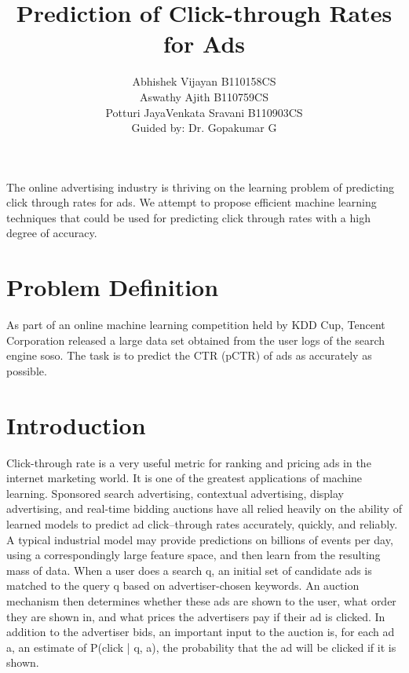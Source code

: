 \documentclass[10pt]{article}
\title{Prediction of Click-through Rates for Ads}
\author{ Abhishek Vijayan     B110158CS\\  Aswathy Ajith     B110759CS\\  Potturi JayaVenkata Sravani    B110903CS\\  Guided by: Dr. Gopakumar G}
\begin{document}
	
\maketitle
	

\abstract{} 
The online advertising industry is thriving on the learning problem of predicting click through rates for ads. We attempt to propose efficient machine learning techniques that could be used for predicting click through rates with a high degree of accuracy.
\section{Problem Definition}
As part of an online machine learning competition held by KDD Cup, Tencent Corporation released a large data set obtained from the user logs of the search engine soso. The task is to predict the CTR (pCTR) of ads as accurately as possible.
\section{Introduction}
Click-through rate is a very useful metric for ranking and pricing ads in the internet marketing world. It is one of the greatest applications of machine learning. Sponsored search advertising, contextual advertising, display advertising, and real-time bidding auctions have all relied heavily on the ability of learned models to predict ad click–through rates accurately, quickly, and reliably.  A typical industrial model may provide predictions on billions of events per day, using a correspondingly large feature space, and then learn from the resulting mass of data. When a user does a search q, an initial set of candidate ads is matched to the query q based on advertiser-chosen keywords. An auction mechanism then determines whether these ads are shown to the user, what order they are shown in, and what prices the advertisers pay if their ad is clicked. In addition to the advertiser bids, an important input to the auction is, for each ad a, an estimate of P(click | q, a), the probability that the ad will be clicked if it is shown.
\end{document}
